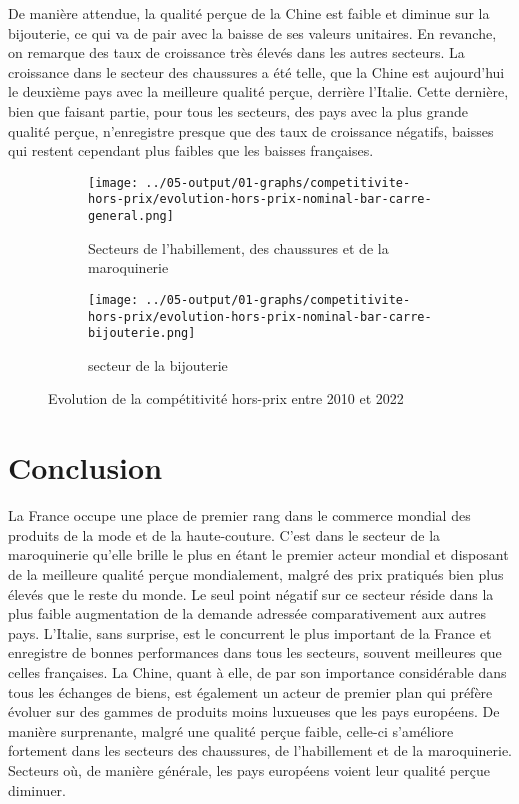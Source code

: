 \documentclass[french,10pt,a4paper]{article}
\begin{document}
De manière attendue, la qualité perçue de la Chine est faible et diminue sur la bijouterie, ce qui va de pair avec la baisse de ses valeurs unitaires. En revanche, on remarque des taux de croissance très élevés dans les autres secteurs. La croissance dans le secteur des chaussures a été telle, que la Chine est aujourd'hui le deuxième pays avec la meilleure qualité perçue, derrière l'Italie. Cette dernière, bien que faisant partie, pour tous les secteurs, des pays avec la plus grande qualité perçue, n'enregistre presque que des taux de croissance négatifs, baisses qui restent cependant plus faibles que les baisses françaises. 


\begin{figure}[!h]
  \centering
  \begin{subfigure}{\textwidth}
    \centering    \texttt{[image: ../05-output/01-graphs/competitivite-hors-prix/evolution-hors-prix-nominal-bar-carre-general.png]}
    \caption{Secteurs de l'habillement, des chaussures et de la maroquinerie}
    \label{fig:evolution-hors-prix-nominal-bar-carre-general}
  \end{subfigure}
  \vspace{0.5cm}
  \begin{subfigure}{\textwidth}
    \centering \texttt{[image: ../05-output/01-graphs/competitivite-hors-prix/evolution-hors-prix-nominal-bar-carre-bijouterie.png]}
 \caption{secteur de la bijouterie}
 \label{fig:evolution-hors-prix-nominal-bar-carre-bijouterie.png}
  \end{subfigure}
  \caption{Evolution de la compétitivité hors-prix entre 2010 et 2022}
  \label{fig:hors-prix}
\end{figure}


\section{Conclusion}
La France occupe une place de premier rang dans le commerce mondial des produits de la mode et de la haute-couture. C'est dans le secteur de la maroquinerie qu'elle brille le plus en étant le premier acteur mondial et disposant de la meilleure qualité perçue mondialement, malgré des prix pratiqués bien plus élevés que le reste du monde. Le seul point négatif sur ce secteur réside dans la plus faible augmentation de la demande adressée comparativement aux autres pays. L'Italie, sans surprise, est le concurrent le plus important de la France et enregistre de bonnes performances dans tous les secteurs, souvent meilleures que celles françaises. La Chine, quant à elle, de par son importance considérable dans tous les échanges de biens, est également un acteur de premier plan qui préfère évoluer sur des gammes de produits moins luxueuses que les pays européens. De manière surprenante, malgré une qualité perçue faible, celle-ci s'améliore fortement dans les secteurs des chaussures, de l'habillement et de la maroquinerie. Secteurs où, de manière générale, les pays européens voient leur qualité perçue diminuer. 
\end{document}

